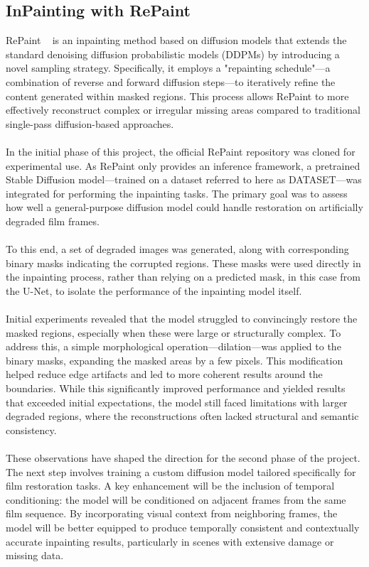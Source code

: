 \documentclass[openany, 12pt]{article}
\begin{document}
{	\subsection{InPainting with RePaint}
	RePaint ~\cite{lugmayr2022repaintinpaintingusingdenoising} is an inpainting method based on diffusion models that extends the standard denoising diffusion probabilistic models (DDPMs) by introducing a novel sampling strategy. Specifically, it employs a "repainting schedule"—a combination of reverse and forward diffusion steps—to iteratively refine the content generated within masked regions. This process allows RePaint to more effectively reconstruct complex or irregular missing areas compared to traditional single-pass diffusion-based approaches.\\
	\\
	In the initial phase of this project, the official RePaint repository was cloned for experimental use. As RePaint only provides an inference framework, a pretrained Stable Diffusion model—trained on a dataset referred to here as DATASET—was integrated for performing the inpainting tasks. The primary goal was to assess how well a general-purpose diffusion model could handle restoration on artificially degraded film frames.\\
	\\
	To this end, a set of degraded images was generated, along with corresponding binary masks indicating the corrupted regions. These masks were used directly in the inpainting process, rather than relying on a predicted mask, in this case from the U-Net, to isolate the performance of the inpainting model itself.\\
	\\
	Initial experiments revealed that the model struggled to convincingly restore the masked regions, especially when these were large or structurally complex. To address this, a simple morphological operation—dilation—was applied to the binary masks, expanding the masked areas by a few pixels. This modification helped reduce edge artifacts and led to more coherent results around the boundaries. While this significantly improved performance and yielded results that exceeded initial expectations, the model still faced limitations with larger degraded regions, where the reconstructions often lacked structural and semantic consistency.\\
	\\
	These observations have shaped the direction for the second phase of the project. The next step involves training a custom diffusion model tailored specifically for film restoration tasks. A key enhancement will be the inclusion of temporal conditioning: the model will be conditioned on adjacent frames from the same film sequence. By incorporating visual context from neighboring frames, the model will be better equipped to produce temporally consistent and contextually accurate inpainting results, particularly in scenes with extensive damage or missing data.
}
\end{document}
